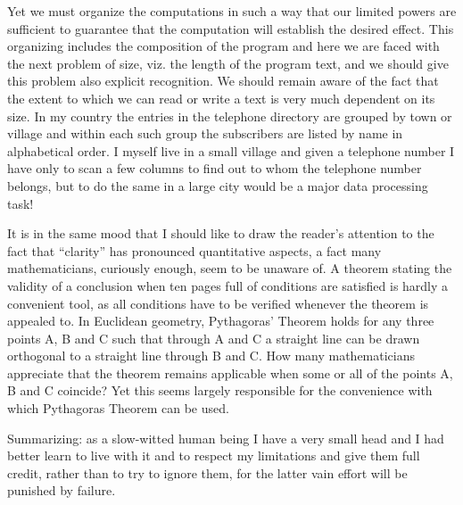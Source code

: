 Yet we must organize the computations in such a way that our limited powers are sufficient to guarantee that the computation will establish the desired effect. This organizing includes the composition of the program and here we are faced with the next problem of size, viz. the length of the program text, and we should give this problem also explicit recognition. We should remain aware of the fact that the extent to which we can read or write a text is very much dependent on its size. In my country the entries in the telephone directory are grouped by town or village and within each such group the subscribers are listed by name in alphabetical order. I myself live in a small village and given a telephone number I have only to scan a few columns to find out to whom the telephone number belongs, but to do the same in a large city would be a major data processing task!

It is in the same mood that I should like to draw the reader's attention to the fact that ``clarity'' has pronounced quantitative aspects, a fact many mathematicians, curiously enough, seem to be unaware of. A theorem stating the validity of a conclusion when ten pages full of conditions are satisfied is hardly a convenient tool, as all conditions have to be verified whenever the theorem is appealed to. In Euclidean geometry, Pythagoras’ Theorem holds for any three points A, B and C such that through A and C a straight line can be drawn orthogonal to a straight line through B and C. How many mathematicians appreciate that the theorem remains applicable when some or all of the points A, B and C coincide? Yet this seems largely responsible for the convenience with which Pythagoras Theorem can be used.

Summarizing: as a slow-witted human being I have a very small head and I had better learn to live with it and to respect my limitations and give them full credit, rather than to try to ignore them, for the latter vain effort will be punished by failure.
